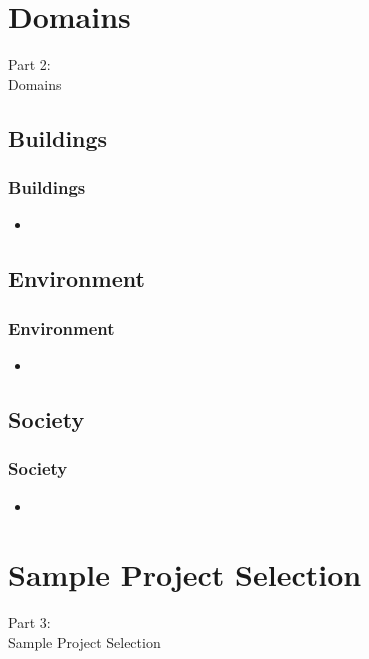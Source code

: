 \section{Domains}
\begin{frame}
    \vspace{25mm}
    \begin{center}
        \Huge{Part 2:\\Domains}
    \end{center}
\end{frame}

\subsection{Buildings}
\begin{frame}
    \frametitle{Buildings}
    \vspace{3mm}
    \begin{itemize}
        \item
    \end{itemize}
\end{frame}

\subsection{Environment}
\begin{frame}
    \frametitle{Environment}
    \vspace{3mm}
    \begin{itemize}
        \item
    \end{itemize}
\end{frame}

\subsection{Society}
\begin{frame}
    \frametitle{Society}
    \vspace{3mm}
    \begin{itemize}
        \item
    \end{itemize}
\end{frame}

\section{Sample Project Selection}
\begin{frame}
    \vspace{25mm}
    \begin{center}
        \Huge{Part 3:\\Sample Project Selection}
    \end{center}
\end{frame}

